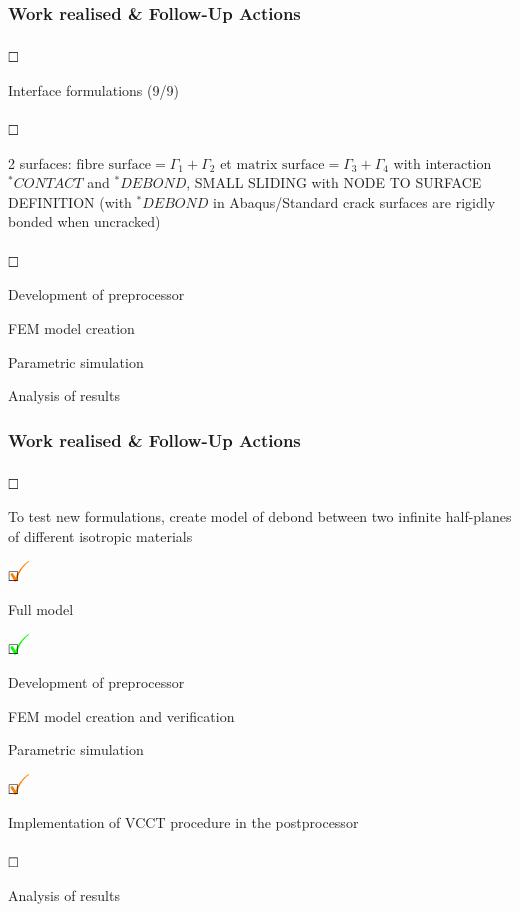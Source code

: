 \documentclass[first,firstsupp,lastsupp,handout,last,hyperref,table]{ETHclass}
\begin{document}
\begin{frame}
\frametitle{Work realised \& Follow-Up Actions}
\vspace{-0.5cm}
\scriptsize
\begin{list}{$\text{\rlap{\textcolor{white}{\huge$\mathbf{\checkmark}$}}}\square$}{}  
\item Interface formulations (9/9)
\begin{list}{$\text{\rlap{\textcolor{white}{\huge$\mathbf{\checkmark}$}}}\square$}{}  
\item  2 surfaces: $\text{fibre surface}=\Gamma_{1}+\Gamma_{2}$ et $\text{matrix surface}=\Gamma_{3}+\Gamma_{4}$ with interaction $^{*}CONTACT$ and $^{*}DEBOND$, SMALL SLIDING with NODE TO SURFACE DEFINITION (with $^{*}DEBOND$ in Abaqus/Standard crack surfaces are rigidly bonded when uncracked)
\begin{list}{$\text{\rlap{\textcolor{white}{\huge$\mathbf{\checkmark}$}}}\square$}{}  
\item Development of preprocessor
\item FEM model creation
\item Parametric simulation
\item Analysis of results
\end{list}
\end{list}
\end{list}
\end{frame}

\begin{frame}
\frametitle{Work realised \& Follow-Up Actions}
\vspace{-0.5cm}
\scriptsize
\begin{list}{$\text{\rlap{\textcolor{white}{\huge$\mathbf{\checkmark}$}}}\square$}{}  
\item To test new formulations, create model of debond between two infinite half-planes of different isotropic materials
\begin{list}{$\text{\rlap{\textcolor{orange}{\huge$\mathbf{\checkmark}$}}}\square$}{} 
\item Full model
\begin{list}{$\text{\rlap{\textcolor{green}{\huge$\mathbf{\checkmark}$}}}\square$}{}
\item Development of preprocessor
\item FEM model creation and verification
\item Parametric simulation
\end{list}
\begin{list}{$\text{\rlap{\textcolor{orange}{\huge$\mathbf{\checkmark}$}}}\square$}{}
\item Implementation of VCCT procedure in the postprocessor
\end{list}
\begin{list}{$\text{\rlap{\textcolor{white}{\huge$\mathbf{\checkmark}$}}}\square$}{}
\item Analysis of results
\end{list}
\end{list}
\end{list}
\end{frame}
\end{document}
